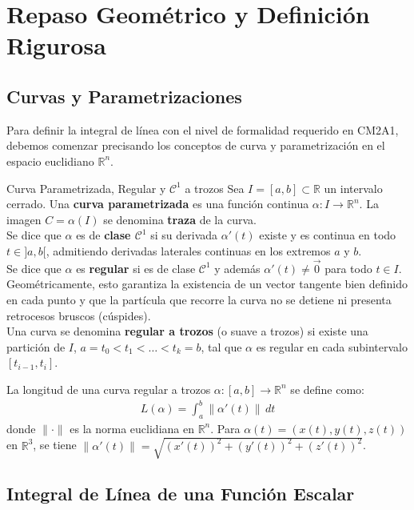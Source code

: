 \documentclass[11pt,a4paper]{article}
\begin{document}
\section{Repaso Geométrico y Definición Rigurosa}

\subsection{Curvas y Parametrizaciones}

Para definir la integral de línea con el nivel de formalidad requerido en CM2A1, debemos comenzar precisando los conceptos de curva y parametrización en el espacio euclidiano $\mathbb{R}^n$.

\begin{definicionbox}{Curva Parametrizada, Regular y $\mathcal{C}^1$ a trozos}
Sea $I = [a, b] \subset \mathbb{R}$ un intervalo cerrado. Una \textbf{curva parametrizada} es una función continua $\alpha: I \to \mathbb{R}^n$. La imagen $C = \alpha(I)$ se denomina \textbf{traza} de la curva.\\
Se dice que $\alpha$ es de \textbf{clase $\mathcal{C}^1$} si su derivada $\alpha'(t)$ existe y es continua en todo $t \in ]a, b[$, admitiendo derivadas laterales continuas en los extremos $a$ y $b$.\\
Se dice que $\alpha$ es \textbf{regular} si es de clase $\mathcal{C}^1$ y además $\alpha'(t) \neq \vec{0}$ para todo $t \in I$. Geométricamente, esto garantiza la existencia de un vector tangente bien definido en cada punto y que la partícula que recorre la curva no se detiene ni presenta retrocesos bruscos (cúspides).\\
Una curva se denomina \textbf{regular a trozos} (o suave a trozos) si existe una partición de $I$, $a = t_0 < t_1 < \dots < t_k = b$, tal que $\alpha$ es regular en cada subintervalo $[t_{i-1}, t_i]$.
\end{definicionbox}

La longitud de una curva regular a trozos $\alpha: [a,b] \to \mathbb{R}^n$ se define como:
\begin{align*}
L(\alpha) = \int_a^b \|\alpha'(t)\| \, dt
\end{align*}
donde $\|\cdot\|$ es la norma euclidiana en $\mathbb{R}^n$. Para $\alpha(t) = (x(t), y(t), z(t))$ en $\mathbb{R}^3$, se tiene $\|\alpha'(t)\| = \sqrt{(x'(t))^2 + (y'(t))^2 + (z'(t))^2}$.

\subsection{Integral de Línea de una Función Escalar}
\end{document}
